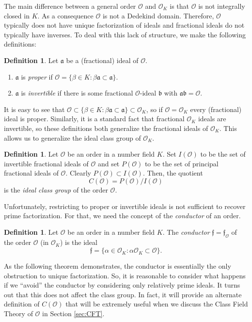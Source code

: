 \documentclass{amsart}
\theoremstyle{definition}
\newtheorem{definition}[thm]{Definition}
\theoremstyle{remark}
\numberwithin{equation}{section}
\newcommand{\cO}{\mathcal O}
\newcommand{\fka}{\mathfrak a}
\newcommand{\fkb}{\mathfrak b}
\newcommand{\fkf}{\mathfrak f}
\begin{document}
The main difference between a general order $\cO$ and $\cO_{K}$ is that $\cO$ is not integrally closed in $K$. As a consequence $\cO$ is not a Dedekind domain. Therefore, $\cO$ typically does not have unique factorization of ideals and fractional ideals do not typically have inverses. To deal with this lack of structure, we make the following definitions:

\begin{definition} \label{def:ProperInvertibleIdeals}
Let $\fka$ be a (fractional) ideal of $\cO$.
\begin{enumerate}
\item $\fka$ is \emph{proper} if $\cO = \{ \beta \in K: \beta \fka \subset \fka\}$.
\item $\fka$ is \emph{invertible} if there is some fractional $\cO$-ideal $\fkb$ with $\fka \fkb = \cO$.
\end{enumerate}
\end{definition}

It is easy to see that $\cO \subset \{ \beta \in K: \beta \fka \subset \fka\} \subset \cO_{K}$, so if $\cO = \cO_{K}$ every (fractional) ideal is proper. Similarly, it is a standard fact that fractional $\cO_{K}$ ideals are invertible, so these definitions both generalize the fractional ideals of $\cO_{K}$. This allows us to generalize the ideal class group of $\cO_{K}$.
 
\begin{definition} 
Let $\cO$ be an order in a number field $K$. Set $I(\cO)$ to be the set of invertible fractional ideals of $\cO$ and set $P(\cO)$ to be the set of principal fractional ideals of $\cO$. Clearly $P(\cO) \subset I(\cO)$. Then, the quotient
\[
C(\cO) = P(\cO)/I(\cO)
\]
is the \emph{ideal class group} of the order $\cO$. 
\end{definition}

 Unfortunately, restricting to proper or invertible ideals is not sufficient to recover prime factorization. For that, we need the concept of the \emph{conductor} of an order.

\begin{definition}
Let $\cO$ be an order in a number field $K$. The \emph{conductor} $\fkf = \fkf_{\cO}$ of the order $\cO$ (in $\cO_{K}$) is the ideal
\[
\fkf = \{\alpha \in \cO_{K}: \alpha \cO_{K} \subset \cO\}.
\]
\end{definition}

 As the following theorem demonstrates, the conductor is essentially the only obstruction to unique factorization. So, it is reasonable to consider what happens if we ``avoid'' the conductor by considering only relatively prime ideals. It turns out that this does not affect the class group. In fact, it will provide an alternate definition of $C(\cO)$ that will be extremely useful when we discuss the Class Field Theory of $\cO$ in Section \ref{sec:CFT}.
\end{document}
